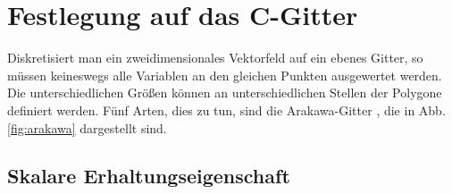 \documentclass{book}
\begin{document}
\section{Festlegung auf das C-Gitter}
\label{sec:festlegung_auf_das_cgitter}

Diskretisiert man ein zweidimensionales Vektorfeld auf ein ebenes Gitter, so müssen keineswegs alle Variablen an den gleichen Punkten ausgewertet werden. Die unterschiedlichen Größen können an unterschiedlichen Stellen der Polygone definiert werden. Fünf Arten, dies zu tun, sind die Arakawa-Gitter \cite{arakawa}, die in Abb. \ref{fig:arakawa} dargestellt sind.

\subsection{Skalare Erhaltungseigenschaft}
\label{sec:skalare_erhaltungseigenschaft}
\end{document}
